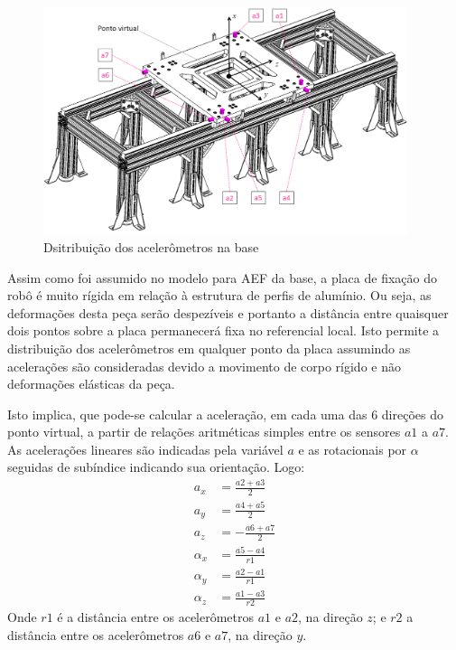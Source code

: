 \begin{figure}[h]
	\centering 
 	\includegraphics[width=0.95\textwidth]{figs/acelerometos-base}
 	\caption{Dsitribuição dos acelerômetros na base}
 	\label{fig::acelerometos-base}
\end{figure}

Assim como foi assumido no modelo para AEF da base, a placa de fixação do robô é
muito rígida em relação à estrutura de perfis de alumínio. Ou seja, as
deformações desta peça serão despezíveis e portanto a distância entre quaisquer
dois pontos sobre a placa permanecerá fixa no referencial local.
Isto permite a distribuição dos acelerômetros em qualquer ponto da placa
assumindo as acelerações são consideradas devido a movimento de corpo rígido e
não deformações elásticas da peça. 

Isto implica, que pode-se calcular a aceleração, em cada uma das 6 direções do
ponto virtual, a partir de relações aritméticas simples entre os sensores $a1$ a
$a7$. As acelerações lineares são indicadas pela variável $a$ e as
rotacionais por $\alpha$ seguidas de subíndice indicando sua orientação. Logo:
%
\begin{align}
	a_x &= \frac{a2+a3}{2} \label{eq::acel_ax}\\
	a_y &= \frac{a4+a5}{2} \\
	a_z &= - \frac{a6+a7}{2} \\
	\alpha_x &= \frac{a5-a4}{r1} \\
	\alpha_y &= \frac{a2-a1}{r1} \\
	\alpha_z &= \frac{a1-a3}{r2} \label{eq::acel_alphaz}
\end{align}
%
Onde $r1$ é a distância entre os acelerômetros $a1$ e $a2$, na direção $z$; e
$r2$ a distância entre os acelerômetros $a6$ e $a7$, na direção $y$.

